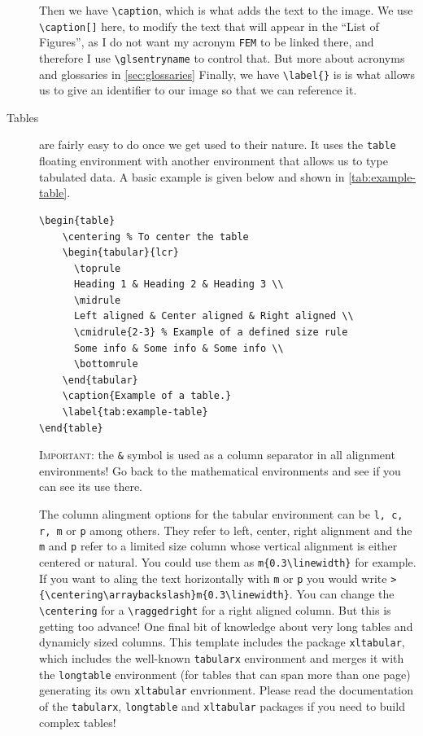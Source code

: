 \begin{description}
	Then we have \verb|\caption|, which is what adds the text to the image. We use \verb|\caption[]| here, to modify the text that will appear in the ``List of Figures'', as I do not want my acronym \texttt{FEM} to be linked there, and therefore I use \verb|\glsentryname| to control that. But more about acronyms and glossaries in \cref{sec:glossaries}
	Finally, we have \verb|\label{}| is is what allows us to give an identifier to our image so that we can reference it.
		\item[Tables] are fairly easy to do once we get used to their nature. It uses the \verb|table| floating environment with another environment that allows us to type tabulated data. A basic example is given below and shown in \cref{tab:example-table}.
\begin{lstlisting}[language={[LaTeX]TeX}]
\begin{table}
	\centering % To center the table
	\begin{tabular}{lcr}
	  \toprule
	  Heading 1 & Heading 2 & Heading 3 \\
	  \midrule
	  Left aligned & Center aligned & Right aligned \\
	  \cmidrule{2-3} % Example of a defined size rule
	  Some info & Some info & Some info \\
	  \bottomrule
	\end{tabular}
	\caption{Example of a table.}
	\label{tab:example-table}
\end{table}
\end{lstlisting}
	\textsc{\color{red}Important:} the \texttt{\&} symbol is used as a column separator in all alignment environments! Go back to the mathematical environments and see if you can see its use there.

	The column alingment options for the tabular environment can be \texttt{l, c, r, m{}} or \texttt{p{}} among others. They refer to left, center, right alignment and the \texttt{m{}} and \texttt{p{}} refer to a limited size column whose vertical alignment is either centered or natural. You could use them as \verb|m{0.3\linewidth}| for example. If you want to aling the text horizontally with \texttt{m} or \texttt{p} you would write \verb|>{\centering\arraybackslash}m{0.3\linewidth}|. You can change the \verb|\centering| for a \verb|\raggedright| for a right aligned column. But this is getting too advance!
	One final bit of knowledge about very long tables and dynamicly sized columns. This template includes the package \texttt{xltabular}, which includes the well-known \verb|tabularx| environment and merges it with the \verb|longtable| environment (for tables that can span more than one page) generating its own \verb|xltabular| envrionment. Please read the documentation of the \texttt{tabularx}, \verb|longtable| and \verb|xltabular| packages if you need to build complex tables!


\end{description}
